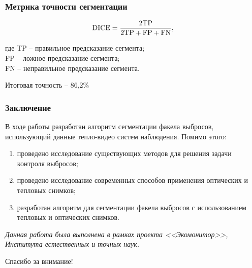 \documentclass[t]{beamer}
\begin{document}
	\begin{frame}
		\frametitle{Метрика точности сегментации}
		\vspace{0.5cm}
		\begin{equation}
			\textup{DICE} = \frac{2\textup{TP}}{2\textup{TP} + \textup{FP} + \textup{FN}},
			\label{eq:DiceLoss}		\vspace{0.3cm}
		\end{equation}

		где TP -- правильное предсказание сегмента;\\ \hfill \break
		\hspace*{0.65cm}FP -- ложное предсказание сегмента;\\ \hfill \break
		\hspace*{0.65cm}FN -- неправильное предсказание сегмента.\\ \hfill \break
		
		Итоговая точность -- 86,2\%
	\end{frame}

	\begin{frame}
		\frametitle{Заключение}
		В ходе работы разработан алгоритм сегментации факела выбросов, использующий данные тепло-видео систем наблюдения. Помимо этого:
		\begin{enumerate}
			\justifying
			\item проведено исследование существующих методов для решения задачи контроля выбросов;
			\item проведено исследование современных способов применения оптических и тепловых снимков;
			\item разработан алгоритм для сегментации факела выбросов с использованием тепловых и оптических снимков.
		\end{enumerate}
		
		
		\textit{Данная работа была выполнена в рамках проекта <<Экомонитор>>, Института естественных и точных наук.}
	\end{frame}

	\begin{frame}
		\vspace{2.9cm}
		\begin{center}{\Huge{Спасибо за внимание!}}\end{center}
	\end{frame}
\end{document}
